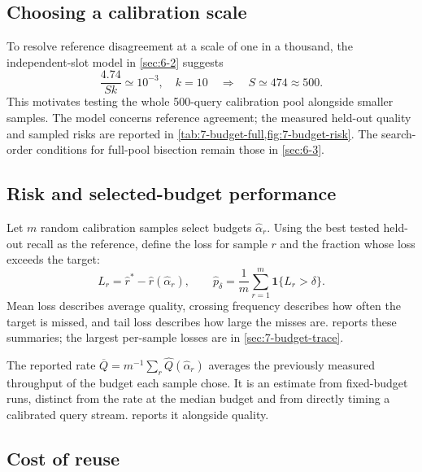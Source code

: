 \subsection{Choosing a calibration scale}

To resolve reference disagreement at a scale of one in a thousand,
the independent-slot model in \cref{sec:6-2} suggests
\[
 \frac{4.74}{Sk}\simeq10^{-3},\quad k=10
 \quad\Longrightarrow\quad S\simeq474\approx500.
\]
This motivates testing the whole 500-query calibration pool alongside
smaller samples. The model concerns reference agreement; the measured
held-out quality and sampled risks are reported in
\cref{tab:7-budget-full,fig:7-budget-risk}. The search-order conditions
for full-pool bisection remain those in \cref{sec:6-3}.

\subsection{Risk and selected-budget performance}

Let $m$ random calibration samples select budgets $\widehat\alpha_r$.
Using the best tested held-out recall as the reference, define the
loss for sample $r$ and the fraction whose loss exceeds the target:
\begin{equation}
 L_r=\widehat r^*-\widehat r(\widehat\alpha_r),\qquad
 \widehat p_\delta=\frac{1}{m}\sum_{r=1}^{m}\mathbf1\{L_r>\delta\}.
 \label{eq:6-risk}
\end{equation}
Mean loss describes average quality, crossing frequency describes how
often the target is missed, and tail loss describes how large the misses
are.  reports these summaries;
the largest per-sample losses are in \cref{sec:7-budget-trace}.

The reported rate
$\overline Q=m^{-1}\sum_r\widehat Q(\widehat\alpha_r)$ averages the
previously measured throughput of the budget each sample chose.
It is an estimate from fixed-budget runs, distinct from the rate at the
median budget and from directly timing a calibrated query stream.
 reports it alongside quality.

\subsection{Cost of reuse}

